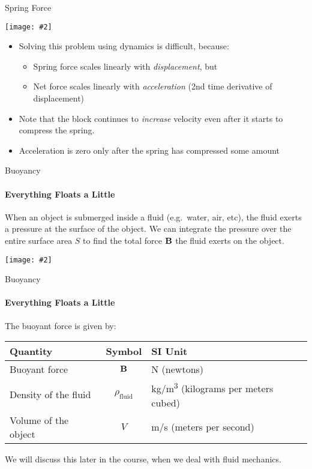 \documentclass[12pt,compress,aspectratio=169]{beamer}
\newcommand{\pic}[2]{\texttt{[image: \#2]}}
\newcommand{\mb}[1]{\ensuremath\mathbf{#1}}
\newcommand{\eq}[2]{\vspace{#1}{\Large\begin{displaymath}#2\end{displaymath}}}
\begin{document}
\begin{frame}{Spring Force}
  \begin{center}
    \pic{.3}{graphics/spring-example1.png}
  \end{center}
  \begin{itemize}
  \item Solving this problem using dynamics is difficult, because:
    \begin{itemize}
    \item Spring force scales linearly with \emph{displacement}, but
    \item Net force scales linearly with \emph{acceleration} (2nd time
      derivative of displacement)
    \end{itemize}
  \item Note that the block continues to \emph{increase} velocity even after
    it starts to compress the spring.
  \item Acceleration is zero only after the spring has compressed some amount
  \end{itemize}
\end{frame}



\begin{frame}{Buoyancy}
  \framesubtitle{Everything Floats a Little}
  When an object is submerged inside a fluid (e.g.\ water, air, etc), the fluid
  exerts a pressure at the surface of the object. We can integrate the pressure
  over the entire surface area $S$ to find the total force $\mb{B}$ the fluid
  exerts on the object.
  \begin{center}
    \pic{.25}{graphics/rock_fbvectors.jpg}
  \end{center}
\end{frame}



\begin{frame}{Buoyancy}
  \framesubtitle{Everything Floats a Little}
  The buoyant force is given by:
  \eq{-.1in}{
    \mb{B}
    =\rho_\mathrm{fluid}g\bm{\hat{k}}\iiint dV
    =\rho_\mathrm{fluid}gV\bm{\hat{k}}
  }

  \begin{center}
    \begin{tabular}{l|c|l}
      \rowcolor{pink}
      \textbf{Quantity} & \textbf{Symbol} & \textbf{SI Unit} \\ \hline
      Buoyant force & $\mb{B}$  & \si{\newton} (newtons)\\
      Density of the fluid & $\rho_\mathrm{fluid}$ & \si{\kg/\m^3}
      (kilograms per meters cubed)\\
      Volume of the object & $V$ & \si{\m/\s} (meters per second)
    \end{tabular}
  \end{center}

  We will discuss this later in the course, when we deal with fluid mechanics.
\end{frame}
\end{document}
